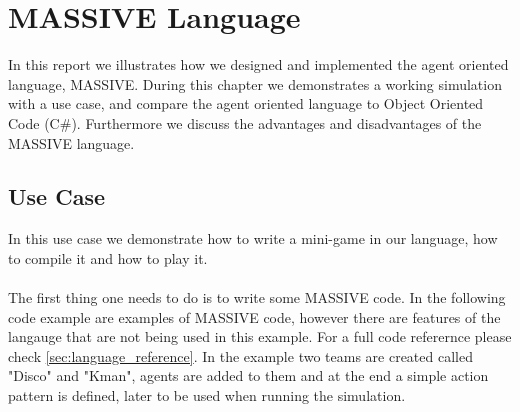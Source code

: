 \chapter{MASSIVE Language}
\label{usecase}

In this report we illustrates how we designed and implemented the agent oriented language, MASSIVE. During this chapter we demonstrates a working simulation with a use case, and compare the agent oriented language to Object Oriented Code (C\#). Furthermore we discuss the advantages and disadvantages of the MASSIVE language. 

\section{Use Case}
In this use case we demonstrate how to write a mini-game in our language, how to compile it and how to play it. \\
 \\
The first thing one needs to do is to write some MASSIVE code. In the following code example are examples of MASSIVE code, however there are features of the langauge that are not being used in this example. For a full code referernce please check \ref{sec:language_reference}. In the example two teams are created called "Disco" and "Kman", agents are added to them and at the end a simple action pattern is defined, later to be used when running the simulation.

